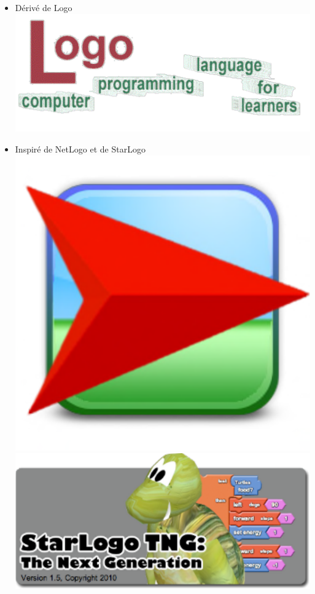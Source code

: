 \begin{frame}
\begin{itemize}
	\item Dérivé de Logo
		\includegraphics[scale=0.4]{doc/Presentation/image/logo.pdf}
	\item Inspiré de NetLogo et de StarLogo
		\includegraphics[scale=0.3]{doc/Presentation/image/netlogo.pdf}
		\includegraphics[scale=0.4]{doc/Presentation/image/starlogo.pdf}
\end{itemize}
\end{frame}

